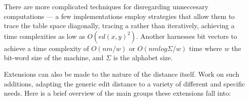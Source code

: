 \documentclass[a4paper,11pt,twoside,notitlepage]{article}
\begin{document}
        There are more complicated techniques for disregarding
        unneccesary computations --- a few implementations employ
        strategies that allow them to trace the table space
        diagonally, tracing a rather than iteratively, achieving a
        time complexities as low as $O(ed(x, y)^2)$.\cite{Chang1992}
        Another harnesses bit vectors to achieve a time complexity of
        $O(nm/w)$ or $O(nm log {\Sigma}/w)$ time where $w$ the
        bit-word size of the machine, and $\Sigma$ is the alphabet
        size.\cite{Myers1999}

        Extensions can also be made to the nature of the distance
        itself. Work on such additions, adapting the generic edit
        distance to a variety of different and specific needs. Here is
        a brief overview of the main groups these extensions fall
        into:
\end{document}
